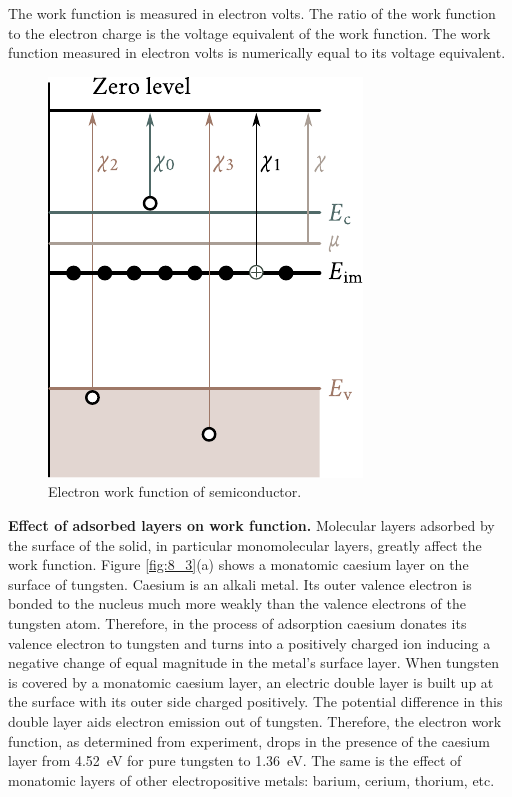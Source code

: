 The work function is measured in electron volts. The ratio of the work function to the electron charge is the voltage equivalent of the work function. The work function measured in electron volts is numerically equal to its voltage equivalent.

\begin{figure}[t]
	\begin{center}
		\includegraphics[scale=1]{figures/ch_08/fig_8_2.pdf}
		\caption[]{Electron work function of semiconductor.}
		\label{fig:8_2}
	\end{center}
	\vspace{-0.8cm}
\end{figure}

\textbf{Effect of adsorbed layers on work function.} Molecular layers adsorbed by the surface of the solid, in particular monomolecular layers, greatly affect the work function. Figure \ref{fig:8_3}(a) shows a monatomic caesium layer on the surface of tungsten. Caesium is an alkali metal. Its outer valence electron is bonded to the nucleus much more weakly than the valence electrons of the tungsten atom. Therefore, in the process of adsorption caesium donates its valence electron to tungsten and turns into a positively charged ion inducing a negative change of equal magnitude in the metal's surface layer. When tungsten is covered by a monatomic caesium layer, an electric double layer is built up at the surface with its outer side charged positively. The potential difference in this double layer aids electron emission out of tungsten. Therefore, the electron work function, as determined from experiment, drops in the presence of the caesium layer from \SI{4.52}{\electronvolt} for pure tungsten to \SI{1.36}{\electronvolt}. The same is the effect of monatomic layers of other electropositive metals: barium, cerium, thorium, etc.

